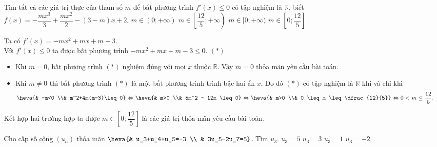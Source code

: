 \begin{ex}%
 Tìm tất cả các giá trị thực của tham số $m$ để bất phương trình $f'(x)\leq 0$ có tập nghiệm là $\mathbb{R}$, biết $f(x) = -\dfrac{mx^3}{3}+\dfrac{mx^2}{2}-(3-m)x+2$.
 \choice
  {$m \in (0;+\infty)$}
  {$m \in \left[\dfrac{12}{5};+\infty\right)$}
  {$m \in [0;+\infty)$}
  {\True $m \in \left[0;\dfrac{12}{5}\right]$}
 \loigiai
  {
  Ta có $f'(x) = -mx^2 + mx + m - 3$.\\
  Với $f'(x) \leq 0$ ta được bất phương trình $-mx^2 + mx + m - 3 \leq 0$. \hfill $(*)$
  \begin{itemize}
   \item Khi $m = 0$, bất phương trình $(*)$ nghiệm đúng với mọi $x$ thuộc $\mathbb{R}$. Vậy $m = 0$ thỏa mãn yêu cầu bài toán.
   \item Khi $m \neq 0$ thì bất phương trình $(*)$ là một bất phương trình trình bậc hai ẩn $x$. Do đó $(*)$ có tập nghiệm là $\mathbb{R}$ khi và chỉ khi
   \begin{align*}
    \heva{& -m<0 \\& m^2+4m(m-3)\leq 0}\Leftrightarrow \heva{& m>0 \\& 5m^2 - 12m \leq 0} \Leftrightarrow \heva{& m>0 \\& 0 \leq m \leq \dfrac{12}{5}} \Leftrightarrow 0<m \leq \dfrac{12}{5}.
   \end{align*}
  \end{itemize}
  Kết hợp hai trường hợp ta được $m \in \left[0;\dfrac{12}{5}\right]$ là các giá trị thỏa mãn yêu cầu bài toán.
  }
\end{ex}

\begin{ex}%
Cho cấp số cộng $\left(u_n\right)$ thỏa mãn $\heva{& u_3+u_4+u_5=-3 \\
		& 3u_5-2u_7=5}$. Tìm $u_3$. 
	\choice
	{$u_3=5$}
	{$u_3=3$}
	{\True $u_3=1$}
	{$u_3=-2$}
\end{ex}


